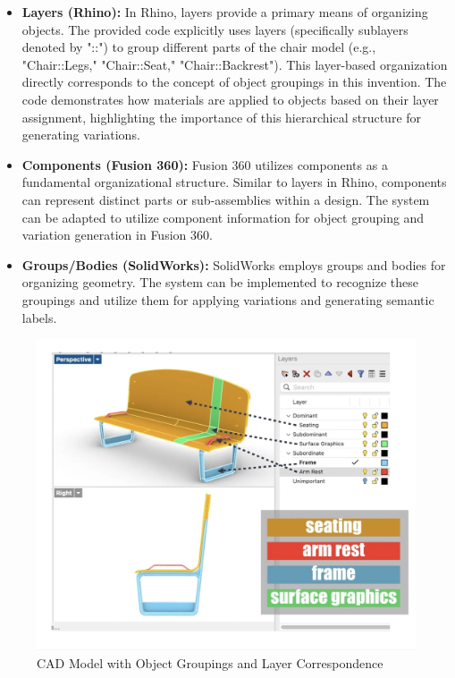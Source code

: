 \documentclass[12pt]{report}
\begin{document}
\begin{itemize}
    \item \textbf{Layers (Rhino):} In Rhino, layers provide a primary means of organizing objects. The provided code explicitly uses layers (specifically sublayers denoted by "::") to group different parts of the chair model (e.g., "Chair::Legs," "Chair::Seat," "Chair::Backrest"). This layer-based organization directly corresponds to the concept of object groupings in this invention. The code demonstrates how materials are applied to objects based on their layer assignment, highlighting the importance of this hierarchical structure for generating variations.
    \item \textbf{Components (Fusion 360):} Fusion 360 utilizes components as a fundamental organizational structure. Similar to layers in Rhino, components can represent distinct parts or sub-assemblies within a design. The system can be adapted to utilize component information for object grouping and variation generation in Fusion 360.
    \item \textbf{Groups/Bodies (SolidWorks):} SolidWorks employs groups and bodies for organizing geometry. The system can be implemented to recognize these groupings and utilize them for applying variations and generating semantic labels.
\end{itemize}

\begin{figure}[!htbp]
    \centering
    \includegraphics[width=\textwidth]{figures/figure-perspective-right-layers-colors-labled-arrows-2.jpg}
    \caption{CAD Model with Object Groupings and Layer Correspondence}
    \label{fig:cad_model_groupings}
\end{figure}
\end{document}
